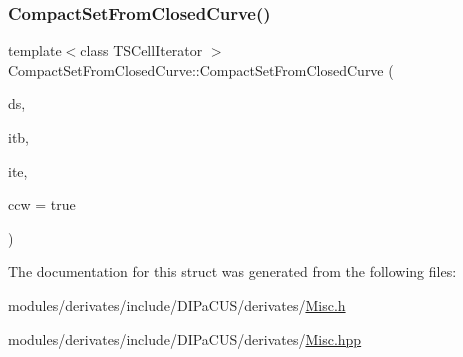 \subsubsection{\texorpdfstring{Compact\+Set\+From\+Closed\+Curve()}{CompactSetFromClosedCurve()}}
{\footnotesize\ttfamily template$<$class T\+S\+Cell\+Iterator $>$ \\
Compact\+Set\+From\+Closed\+Curve\+::\+Compact\+Set\+From\+Closed\+Curve (\begin{DoxyParamCaption}\item[{\mbox{\hyperlink{structDIPaCUS_1_1Misc_1_1CompactSetFromClosedCurve_a47e3100b4196961a629785d14f6ad645}{Digital\+Set}} \&}]{ds,  }\item[{T\+S\+Cell\+Iterator}]{itb,  }\item[{T\+S\+Cell\+Iterator}]{ite,  }\item[{bool}]{ccw = {\ttfamily true} }\end{DoxyParamCaption})}



The documentation for this struct was generated from the following files\+:\begin{DoxyCompactItemize}
\item 
modules/derivates/include/\+D\+I\+Pa\+C\+U\+S/derivates/\mbox{\hyperlink{Misc_8h}{Misc.\+h}}\item 
modules/derivates/include/\+D\+I\+Pa\+C\+U\+S/derivates/\mbox{\hyperlink{Misc_8hpp}{Misc.\+hpp}}\end{DoxyCompactItemize}
